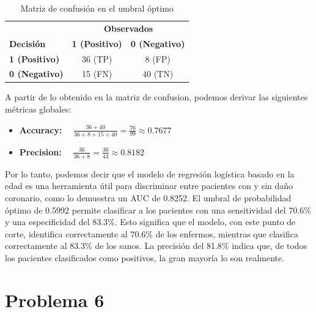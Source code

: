 \begin{table}[H]
    \centering
    \caption{Matriz de confusión en el umbral óptimo}
    \label{tab:confusion_matrix}
    \begin{tabular}{lcc}
        \toprule
        & \multicolumn{2}{c}{\textbf{Observados}} \\
        \cmidrule(lr){2-3}
        \textbf{Decisión} & \textbf{1 (Positivo)} & \textbf{0 (Negativo)} \\
        \midrule
        \textbf{1 (Positivo)} & 36 (TP) & 8 (FP) \\
        \textbf{0 (Negativo)} & 15 (FN) & 40 (TN) \\
        \bottomrule
    \end{tabular}
\end{table}

A partir de lo obtenido en la matriz de confusion, podemos derivar las siguientes métricas globales:

\begin{itemize}
    \item \textbf{Accuracy:} $\quad\displaystyle\frac{36 + 40}{36+8+15+40} = \frac{76}{99} \approx 0.7677 $
    \item \textbf{Precision:} $\quad\displaystyle\frac{36}{36+8} = \frac{36}{44} \approx 0.8182 $
\end{itemize}

\begin{tcolorbox}
Por lo tanto, podemos decir que el modelo de regresión logística basado en la edad es una herramienta útil para discriminar entre pacientes con y sin daño coronario, como lo demuestra un AUC de 0.8252. El umbral de probabilidad óptimo de 0.5992 permite clasificar a los pacientes con una sensitividad del 70.6\% y una especificidad del 83.3\%. Esto significa que el modelo, con este punto de corte, identifica correctamente al 70.6\% de los enfermos, mientras que clasifica correctamente al 83.3\% de los sanos. La precisión del 81.8\% indica que, de todos los pacientes clasificados como positivos, la gran mayoría lo son realmente.
\end{tcolorbox}

\newpage

\section*{Problema \textcolor{CIMATRed}{6}}

